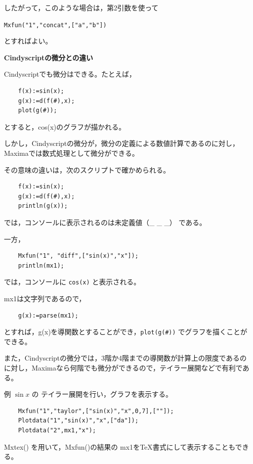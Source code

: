 \documentclass[papersize,a4paper,12pt,uplatex]{jsarticle}
\begin{document}
\begin{description}
  したがって，このような場合は，第2引数を使って
  
      \verb|Mxfun("1","concat",["a","b"])|
 
  とすればよい。
  
\vspace{\baselineskip}
{\bf Cindyscriptの微分との違い}

  Cindyscriptでも微分はできる。たとえば，
\begin{verbatim}
    f(x):=sin(x);
    g(x):=d(f(#),x);
    plot(g(#));
\end{verbatim}
  とすると，cos(x)のグラフが描かれる。
  
  しかし，Cindyscriptの微分が，微分の定義による数値計算であるのに対し，Maximaでは数式処理として微分ができる。
  
  その意味の違いは，次のスクリプトで確かめられる。
\begin{verbatim}
    f(x):=sin(x);
    g(x):=d(f(#),x);
    println(g(x));
\end{verbatim}
  では，コンソールに表示されるのは未定義値（\_ \_ \_） である。
  
一方，
\begin{verbatim}
    Mxfun("1", "diff",["sin(x)","x"]);
    println(mx1);
\end{verbatim}
では，コンソールに \verb|cos(x)| と表示される。

mx1は文字列であるので，
\begin{verbatim}
    g(x):=parse(mx1);
\end{verbatim}
とすれば，g(x)を導関数とすることができ，\verb|plot(g(#))| でグラフを描くことができる。

  また，Cindyscriptの微分では，3階か4階までの導関数が計算上の限度であるのに対し，Maximaなら何階でも微分ができるので，テイラー展開などで有利である。
  
\vspace{\baselineskip}
\vspace{\baselineskip}
例  $\sin x$ の テイラー展開を行い，グラフを表示する。
\begin{verbatim}
    Mxfun("1","taylor",["sin(x)","x",0,7],[""]);
    Plotdata("1","sin(x)","x",["da"]);
    Plotdata("2",mx1,"x");
\end{verbatim}
\vspace{\baselineskip}
        \begin{center}  \end{center}
\vspace{\baselineskip}
Mxtex() を用いて，Mxfun()の結果の mx1をTeX書式にして表示することもできる。


\end{description}
\end{document}
